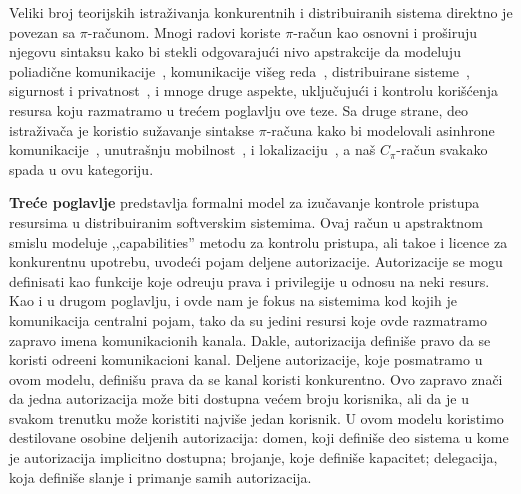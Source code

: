 
Veliki broj teorijskih istra\v zivanja konkurentnih i distribuiranih sistema direktno je povezan sa $\pi$-ra\v cunom. Mnogi radovi koriste $\pi$-ra\v cun kao osnovni i pro\v siruju njegovu sintaksu kako bi stekli odgovaraju\' ci nivo apstrakcije da mo{\-}deluju poliadi\v cne komunikacije~\cite{DBLP:journals/njc/CarboneM03, DBLP:conf/concur/Milner92}, 
komunikacije vi\v seg reda~\cite{DBLP:conf/csl/Milner93}, 
distribuirane sisteme~\cite{DBLP:books/daglib/0018113}, sigurnost i privatnost~\cite{appliedpi,spi,cardelli05,pigroups,Giunti,hennessy05}, i mnoge druge aspekte, uklju\v cuju\' ci i kontrolu kori\v s\' cenja resursa koju razmatramo u tre\' cem poglavlju ove teze. 
Sa druge strane, deo istra\v ziva\v ca je koristio su\v zavanje sintakse $\pi$-ra\v cuna kako bi modelovali 
asinhrone komunikacije~\cite{ boudol:inria-00076939,DBLP:conf/ecoop/HondaT91}, unutra\v snju mobilnost~\cite{DBLP:journals/tcs/Sangiorgi96a}, i lokalizaciju~\cite{merro04}, a na\v s $C_\pi$-ra\v cun svakako spada u ovu kategoriju.




{\bf Tre\' ce poglavlje} predstavlja formalni model za izu\v cavanje kontrole pristupa resursima u distribuiranim softverskim sistemima. Ovaj ra\v cun u apstraktnom smislu modeluje ,,capabilities'' metodu za kontrolu pristupa, ali tako\dj e i licence za konkurentnu upotrebu, uvode\' ci pojam deljene autorizacije. Autorizacije se mogu definisati kao funkcije koje odre\dj uju prava i privilegije u odnosu na neki resurs. Kao i u drugom poglavlju, i ovde nam je fokus na sistemima kod kojih je komunikacija centralni pojam, tako da su jedini resursi koje ovde razmatramo zapravo imena komunikacionih kanala. Dakle, autorizacija defini\v se pravo da se koristi odre\dj eni komunikacioni kanal. Deljene autorizacije, koje posmatramo u ovom modelu, defini\v su prava da se kanal koristi konkurentno. Ovo zapravo zna\v ci da jedna autorizacija mo\v ze biti dostupna ve\' cem broju korisnika, ali da je u svakom trenutku mo\v ze koristiti najvi\v se jedan korisnik. 
U ovom modelu koristimo destilovane osobine deljenih autorizacija: domen, koji defini\v se deo sistema u kome je autorizacija implicitno dostupna; brojanje, koje defini\v se kapacitet; delegacija, koja defini\v se slanje i primanje samih autorizacija. 


